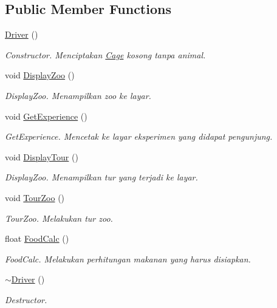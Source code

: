 \subsection*{Public Member Functions}
\begin{DoxyCompactItemize}
\item 
\hyperlink{classDriver_af0658d103e3e810a8e9ef0a53bb2e261}{Driver} ()
\begin{DoxyCompactList}\small\item\em Constructor. Menciptakan \hyperlink{classCage}{Cage} kosong tanpa animal. \end{DoxyCompactList}\item 
void \hyperlink{classDriver_aa8b4e139b99aad4720ce86286783dcdb}{Display\+Zoo} ()
\begin{DoxyCompactList}\small\item\em Display\+Zoo. Menampilkan zoo ke layar. \end{DoxyCompactList}\item 
void \hyperlink{classDriver_a2bc17a8251eab4cfdb7d74c7f7299c6e}{Get\+Experience} ()
\begin{DoxyCompactList}\small\item\em Get\+Experience. Mencetak ke layar eksperimen yang didapat pengunjung. \end{DoxyCompactList}\item 
void \hyperlink{classDriver_af3677b3b6adc2ccc5d486be1e4462fba}{Display\+Tour} ()
\begin{DoxyCompactList}\small\item\em Display\+Zoo. Menampilkan tur yang terjadi ke layar. \end{DoxyCompactList}\item 
void \hyperlink{classDriver_aa56ed0eaa789f78765708e15032d6534}{Tour\+Zoo} ()
\begin{DoxyCompactList}\small\item\em Tour\+Zoo. Melakukan tur zoo. \end{DoxyCompactList}\item 
float \hyperlink{classDriver_a0f85e40efd4983b0434307ca0647f378}{Food\+Calc} ()
\begin{DoxyCompactList}\small\item\em Food\+Calc. Melakukan perhitungan makanan yang harus disiapkan. \end{DoxyCompactList}\item 
\hyperlink{classDriver_ac7645eea8d3ce2bc39ddbda5e840297a}{$\sim$\+Driver} ()
\begin{DoxyCompactList}\small\item\em Destructor. \end{DoxyCompactList}\item 

\end{DoxyCompactItemize}
